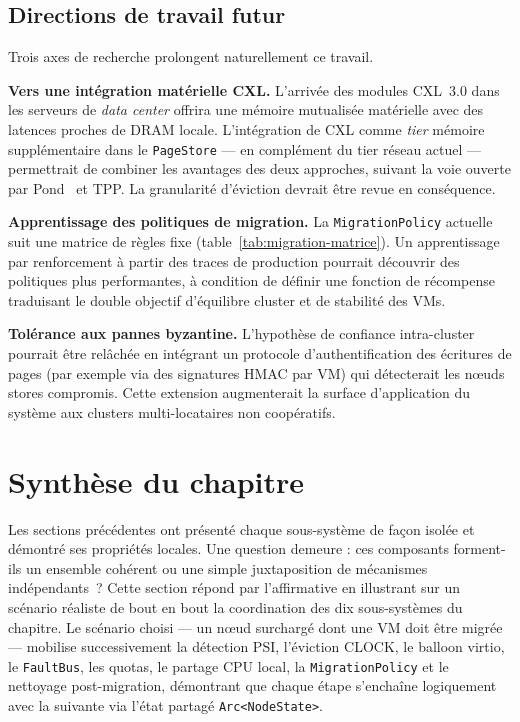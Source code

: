 \subsection{Directions de travail futur}
\label{subsec:futurs-travaux}

Trois axes de recherche prolongent naturellement ce travail.

\textbf{Vers une intégration matérielle CXL.} L'arrivée des modules CXL~3.0 dans les serveurs de \textit{data center} offrira une mémoire mutualisée matérielle avec des latences proches de DRAM locale. L'intégration de CXL comme \emph{tier} mémoire supplémentaire dans le \texttt{PageStore} --- en complément du tier réseau actuel --- permettrait de combiner les avantages des deux approches, suivant la voie ouverte par Pond~\cite{li_2023_pond} et TPP. La granularité d'éviction devrait être revue en conséquence.

\textbf{Apprentissage des politiques de migration.} La \texttt{MigrationPolicy} actuelle suit une matrice de règles fixe (table~\ref{tab:migration-matrice}). Un apprentissage par renforcement à partir des traces de production pourrait découvrir des politiques plus performantes, à condition de définir une fonction de récompense traduisant le double objectif d'équilibre cluster et de stabilité des VMs.

\textbf{Tolérance aux pannes byzantine.} L'hypothèse de confiance intra-cluster pourrait être relâchée en intégrant un protocole d'authentification des écritures de pages (par exemple via des signatures HMAC par VM) qui détecterait les nœuds stores compromis. Cette extension augmenterait la surface d'application du système aux clusters multi-locataires non coopératifs.

\section{Synthèse du chapitre}
\label{sec:synthese}

Les sections précédentes ont présenté chaque sous-système de façon isolée et démontré ses propriétés locales. Une question demeure : ces composants forment-ils un ensemble cohérent ou une simple juxtaposition de mécanismes indépendants~? Cette section répond par l'affirmative en illustrant sur un scénario réaliste de bout en bout la coordination des dix sous-systèmes du chapitre. Le scénario choisi --- un nœud surchargé dont une VM doit être migrée --- mobilise successivement la détection PSI, l'éviction CLOCK, le balloon virtio, le \texttt{FaultBus}, les quotas, le partage CPU local, la \texttt{MigrationPolicy} et le nettoyage post-migration, démontrant que chaque étape s'enchaîne logiquement avec la suivante via l'état partagé \texttt{Arc<NodeState>}.

